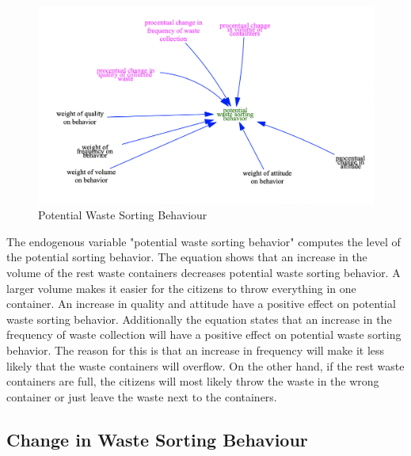 \begin{figure}[H]
\centering
\includegraphics [scale=0.26,angle=360]{figures/potentialbehaviour.png}
\caption{Potential Waste Sorting Behaviour}
\label{fig:potentialbehaviour}
\end{figure}

\indent \newline
The endogenous variable "potential waste sorting behavior" computes the level of the potential sorting behavior. The equation shows that an increase in the volume of the rest waste containers decreases potential waste sorting behavior. A larger volume makes it easier for the citizens to throw everything in one container. An increase in quality and attitude  have a positive effect on potential waste sorting behavior. Additionally the equation states that an increase in the frequency of waste collection will have a positive effect on potential waste sorting behavior. The reason for this is that an increase in frequency will make it less likely that the waste containers will overflow. On the other hand, if the rest waste containers are full, the citizens will most likely throw the waste in the wrong container or just leave the waste next to the containers. 

\subsection{Change in Waste Sorting Behaviour}

